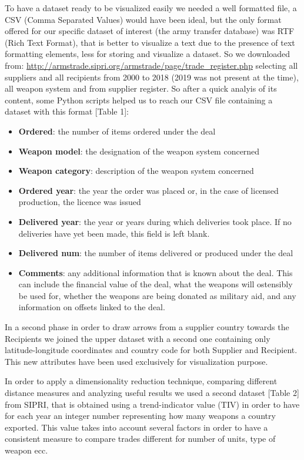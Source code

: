 \documentclass{article}
\begin{document}
\begin{multicols}{2}
To have a dataset ready to be visualized easily we needed a well formatted file, a CSV (Comma Separated Values) would have been ideal, but the only format offered for our specific dataset of interest (the army transfer database) was RTF (Rich Text Format), that is better to visualize a text due to the presence of text formatting elements, less for storing and visualize a dataset. So we downloaded from: \url{http://armstrade.sipri.org/armstrade/page/trade_register.php} selecting all suppliers and all recipients from 2000 to 2018 (2019 was not present at the time), all weapon system and from supplier register. So after a quick analyis of its content, some Python scripts helped us to reach our CSV file containing a dataset with this format [Table 1]:
\begin{itemize}
\item \textbf{Ordered}: the number of items ordered under the deal
\item \textbf{Weapon model}: the designation of the weapon system concerned
\item \textbf{Weapon category}: description of the weapon system concerned
\item \textbf{Ordered year}: the year the order was placed or, in the case of licensed production, the licence was issued
\item \textbf{Delivered year}: the year or years during which deliveries took place. If no deliveries have yet been made, this field is left blank.
\item \textbf{Delivered num}: the number of items delivered or produced under the deal
\item \textbf{Comments}: any additional information that is known about the deal. This can include the financial value of the deal, what the weapons will ostensibly be used for, whether the weapons are being donated as military aid, and any information on offsets linked to the deal.
 
\end{itemize}



In a second phase in order to draw arrows from a supplier country towards the Recipients we joined the upper dataset with a second one containing only latitude-longitude coordinates and country code for both Supplier and Recipient. This new attributes have been used exclusively for visualization purpose.

In order to apply a dimensionality reduction technique, comparing different distance measures and analyzing useful results we used a second dataset [Table 2] from SIPRI, that is obtained using a trend-indicator value (TIV) in order to have for each year an integer number representing how many weapons a country exported. This value takes into account several factors in order to have a consistent measure to compare trades different for number of units, type of weapon ecc.




\end{multicols}
\end{document}
